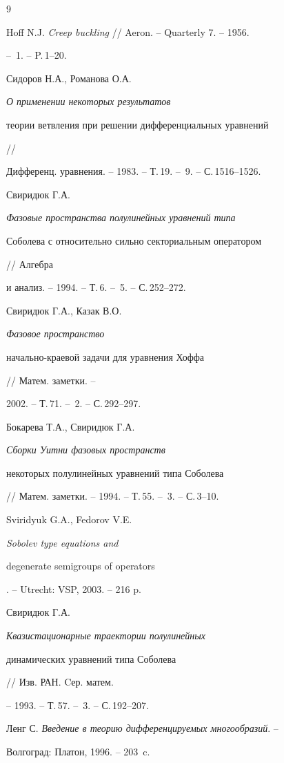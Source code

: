 \begin{thebibliography}{9}







Hoff N.J. {\em Creep buckling} // Aeron. -- Quarterly 7. -- 1956.


-- \No\,1. -- P.\,1--20.






Сидоров Н.А., Романова О.А. {\em О применении некоторых результатов


теории ветвления при решении дифференциальных уравнений} //


Дифференц. уравнения. -- 1983. -- Т.\,19. -- \No\,9. -- С.\,1516--1526.




Свиридюк Г.А. {\em Фазовые пространства полулинейных уравнений типа


Соболева с относительно сильно секториальным оператором} // Алгебра


и анализ. -- 1994. -- Т.\,6. -- \No\,5. -- С.\,252--272.




Свиридюк Г.А., Казак В.О. {\em Фазовое пространство 


начально-краевой задачи для уравнения Хоффа} // Матем. заметки. --


2002. -- Т.\,71. -- \No\,2. -- С.\,292--297.




Бокарева Т.А., Свиридюк Г.А. {\em Сборки Уитни фазовых пространств


некоторых полулинейных уравнений типа Соболева}


// Матем. заметки. -- 1994. -- Т.\,55. -- \No\,3. -- С.\,3--10.




Sviridyuk G.A., Fedorov V.E. {\em Sobolev type equations and


degenerate semigroups of operators}. -- Utrecht: VSP, 2003. -- 216 p.




Свиридюк Г.А. {\em Квазистационарные траектории полулинейных


динамических уравнений типа Соболева} // Изв. РАН. Cер. матем.


-- 1993. -- Т.\,57. -- \No\,3. -- С.\,192--207.




Ленг С. {\em Введение в теорию дифференцируемых многообразий}. --


Волгоград: Платон, 1996. -- 203~c.





\end{thebibliography}





